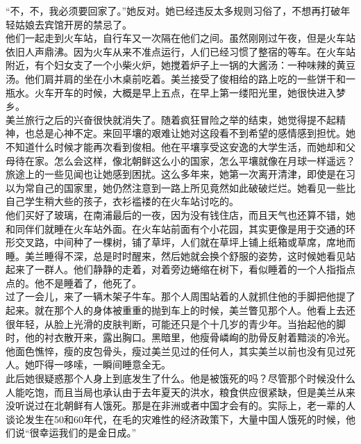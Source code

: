\begin{multicols}{\theparacolNo}
“不，不，我必须要回家了。”她反对。她已经违反太多规则习俗了，不想再打破年轻姑娘去宾馆开房的禁忌了。\\

他们一起走到火车站，自行车又一次隔在他们之间。虽然刚刚过午夜，但是火车站依旧人声鼎沸。因为火车从来不准点运行，人们已经习惯了整宿的等车。在火车站附近，有个妇女支了一个小柴火炉，她搅着炉子上一锅的大酱汤：一种味辣的黄豆汤。他们肩并肩的坐在小木桌前吃着。美兰接受了俊相给的路上吃的一些饼干和一瓶水。火车开车的时候，大概是早上五点，在早上第一缕阳光里，她很快进入梦乡。\\

美兰旅行之后的兴奋很快就消失了。随着疯狂冒险之举的结束，她觉得提不起精神，也总是心神不定。来回平壤的艰难让她对这段看不到希望的感情感到担忧。她不知道什么时候才能再次看到俊相。他在平壤享受这安逸的大学生活，而她却和父母待在家。怎么会这样，像北朝鲜这么小的国家，怎么平壤就像在月球一样遥远？\\

旅途上的一些见闻也让她感到困扰。这么多年来，她第一次离开清津，即使是在习以为常自己的国家里，她仍然注意到一路上所见竟然如此破破烂烂。她看见一些比自己学生稍大些的孩子，衣衫褴褛的在火车站讨吃的。\\

他们买好了玻璃，在南浦最后的一夜，因为没有钱住店，而且天气也还算不错，她和同伴们就睡在火车站外面。在火车站前面有个小花园，其实更像是用于交通的环形交叉路，中间种了一棵树，铺了草坪，人们就在草坪上铺上纸箱或草席，席地而睡。美兰睡得不深，总是时时醒来，然后她就会换个舒服的姿势，这时候她看见站起来了一群人。他们静静的走着，对着旁边蜷缩在树下，看似睡着的一个人指指点点的。他不是睡着了，他死了。\\

过了一会儿，来了一辆木架子牛车。那个人周围站着的人就抓住他的手脚把他提了起来。就在那个人的身体被重重的抛到车上的时候，美兰瞥见那个人。他看上去还很年轻，从脸上光滑的皮肤判断，可能还只是个十几岁的青少年。当抬起他的脚时，他的衬衣散开来，露出胸口。黑暗里，他瘦骨嶙峋的肋骨反射着黯淡的冷光。他面色憔悴，瘦的皮包骨头，瘦过美兰见过的任何人，其实美兰以前也没有见过死人。她吓得一哆嗦，一瞬间睡意全无。\\

此后她很疑惑那个人身上到底发生了什么。他是被饿死的吗？尽管那个时候没什么人能吃饱，而且当局也承认由于去年夏天的洪水，粮食供应很紧缺，但是美兰从来没听说过在北朝鲜有人饿死。那是在非洲或者中国才会有的。实际上，老一辈的人谈论发生在50和60年代，在毛的灾难性的经济政策下，大量中国人饿死的时候，他们说“很幸运我们的是金日成。”\\


\end{multicols}
